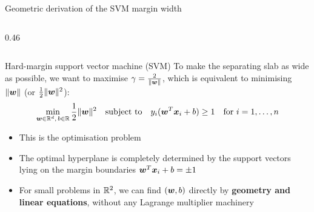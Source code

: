 \documentclass[aspectratio=169]{beamer}\usepackage[]{graphicx}\usepackage[]{xcolor}
\begin{document}
\begin{frame}{Geometric derivation of the SVM margin width}
\begin{columns}[c]
\begin{column}{0.46\textwidth}
    \end{column}
    \end{columns}
\end{frame}


\begin{frame}{Hard-margin support vector machine (SVM)}
    To make the separating slab as wide as possible, we want to maximise $\gamma = \frac{2}{\|\bm{w}\|}$, which is equivalent to minimising $\|\bm{w}\|$ (or $\frac{1}{2}\|\bm{w}\|^2$):
    \[
        \min_{\bm{w} \in \mathbb{R}^d,\, b \in \mathbb{R}} \frac{1}{2}\|\bm{w}\|^2 \quad \text{subject to} \quad y_i(\bm{w}^T \bm{x}_i + b) \ge 1 \quad \text{for } i = 1, \ldots, n
    \]
    \vfill
    \begin{itemize}
        \item This is the  optimisation problem
        \vfill
        \item The optimal hyperplane is completely determined by the support vectors lying on the margin boundaries $\bm{w}^T \bm{x}_i + b = \pm 1$
        \vfill
        \item For small problems in $\mathbb{R}^2$, we can find $(\bm{w}, b)$ directly by \textbf{geometry and linear equations}, without any Lagrange multiplier machinery
    \end{itemize}
\end{frame}
\end{document}
